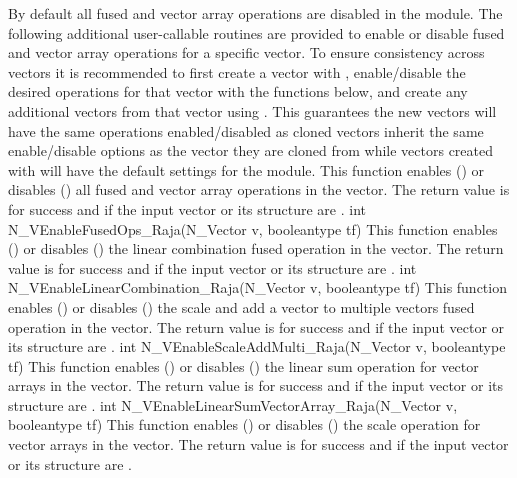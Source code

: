 By default all fused and vector array operations are disabled in the {\nvecraja}
module. The following additional user-callable routines are provided to
enable or disable fused and vector array operations for a specific vector. To
ensure consistency across vectors it is recommended to first create a vector
with , enable/disable the desired operations for that vector
with the functions below, and create any additional vectors from that vector
using . This guarantees the new vectors will have the same
operations enabled/disabled as cloned vectors inherit the same enable/disable
options as the vector they are cloned from while vectors created with
 will have the default settings for the {\nvecraja} module.
{
  This function enables () or disables () all fused and
  vector array operations in the {\raja} vector. The return value is  for
  success and  if the input vector or its  structure are .
}
{
  int N\_VEnableFusedOps\_Raja(N\_Vector v, booleantype tf)
}
{
  This function enables () or disables () the linear
  combination fused operation in the {\raja} vector. The return value is  for
  success and  if the input vector or its  structure are .
}
{
  int N\_VEnableLinearCombination\_Raja(N\_Vector v, booleantype tf)
}
{
  This function enables () or disables () the scale and
  add a vector to multiple vectors fused operation in the {\raja} vector. The
  return value is  for success and  if the input vector or its
   structure are .
}
{
  int N\_VEnableScaleAddMulti\_Raja(N\_Vector v, booleantype tf)
}
{
  This function enables () or disables () the linear sum
  operation for vector arrays in the {\raja} vector. The return value is  for
  success and  if the input vector or its  structure are .
}
{
  int N\_VEnableLinearSumVectorArray\_Raja(N\_Vector v, booleantype tf)
}
{
  This function enables () or disables () the scale
  operation for vector arrays in the {\raja} vector. The return value is  for
  success and  if the input vector or its  structure are .
}
